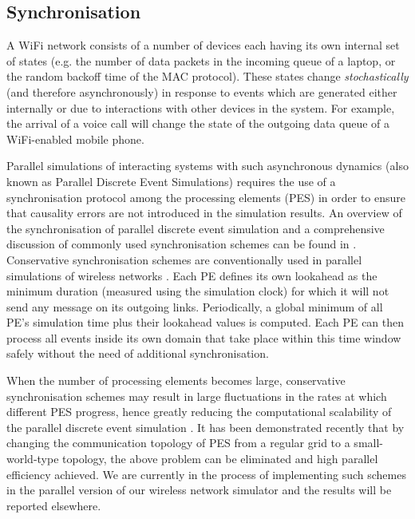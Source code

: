 \documentclass{elsart}
\begin{document}
\subsection{Synchronisation} 
A WiFi network consists of a number of devices each having 
its own internal set of states 
(e.g. the number of data packets in the incoming 
queue of a laptop, or the random backoff time of the MAC protocol). These states 
change {\it stochastically} (and therefore asynchronously)
in response to events which are generated either 
internally or due to interactions with other devices in the system.
For example, the arrival  of a voice call will change the 
state of the outgoing data queue of a WiFi-enabled mobile phone. 

Parallel simulations of interacting systems  with such 
asynchronous dynamics (also known as Parallel Discrete Event
Simulations) requires the use of a synchronisation protocol among 
the processing elements (PES) in order to ensure that 
causality errors are not introduced in the simulation results. 
An  overview of the synchronisation of parallel discrete event 
simulation and a comprehensive discussion of commonly used synchronisation 
schemes can be found in \cite{fujimoto}. 
Conservative synchronisation schemes are conventionally used 
in parallel simulations of  wireless networks \cite{bogodia2,conserve2}.
Each PE defines its own lookahead as the minimum duration 
(measured using the simulation clock) for which it will not send any 
message on its outgoing links. Periodically, a global minimum of all 
PE's simulation time plus their lookahead values is computed.
Each PE can then process all events inside its own domain that take 
place within this time window safely without the need of additional 
synchronisation.

When the number of processing elements 
becomes large, conservative synchronisation schemes may result in  large 
fluctuations in the rates at which different  PES progress,  
hence greatly reducing the computational scalability of the parallel 
discrete event simulation \cite{synch2}.  It has been demonstrated recently  
\cite{synch2} that by changing the  communication topology of PES from 
a regular grid to a {small-world-type} topology, the above problem can be 
eliminated  and high parallel efficiency achieved.
We are currently in the process of implementing such schemes in the 
parallel version of our wireless network simulator and the results 
will be reported elsewhere.
\end{document}
